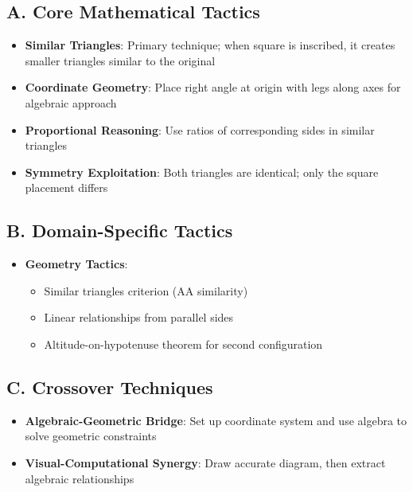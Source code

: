 \documentclass[]{article}
\begin{document}
\begin{tacticalbox}
\subsection*{A. Core Mathematical Tactics}
\begin{itemize}[leftmargin=*]
    \item \textbf{Similar Triangles}: Primary technique; when square is inscribed, it creates smaller triangles similar to the original
    \item \textbf{Coordinate Geometry}: Place right angle at origin with legs along axes for algebraic approach
    \item \textbf{Proportional Reasoning}: Use ratios of corresponding sides in similar triangles
    \item \textbf{Symmetry Exploitation}: Both triangles are identical; only the square placement differs
\end{itemize}

\subsection*{B. Domain-Specific Tactics}
\begin{itemize}[leftmargin=*]
    \item \textbf{Geometry Tactics}:
    \begin{itemize}
        \item Similar triangles criterion (AA similarity)
        \item Linear relationships from parallel sides
        \item Altitude-on-hypotenuse theorem for second configuration
    \end{itemize}
\end{itemize}

\subsection*{C. Crossover Techniques}
\begin{itemize}[leftmargin=*]
    \item \textbf{Algebraic-Geometric Bridge}: Set up coordinate system and use algebra to solve geometric constraints
    \item \textbf{Visual-Computational Synergy}: Draw accurate diagram, then extract algebraic relationships
\end{itemize}
\end{tacticalbox}
\end{document}

